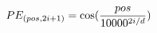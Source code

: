 \documentclass[preview]{standalone}
\begin{document}
\begin{align*}
\special{dvisvgm:raw <g id='unique000'>}PE_{(pos,2i+1)} = \cos(\frac{pos}{10000^{2i/d}})\special{dvisvgm:raw </g>}
\end{align*}
\end{document}
